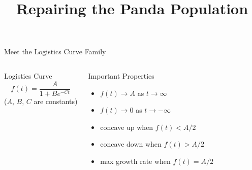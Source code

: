 \documentclass[10pt,aspectratio=1610,xcolor={dvipsnames}]{beamer}
\title{Repairing the Panda Population}
\begin{document}
  \begin{frame}
    \titlepage
  \end{frame}

  \begin{frame}{Meet the Logistics Curve Family}

    \begin{figure}
      \scalebox{0.75}{}
    \end{figure}

    \begin{columns}

      \begin{block}{Logistics Curve}
        \[
          f(t) = \frac{A}{1 + Be^{-Ct}}
        \]
        ($A$, $B$, $C$ are constants)
      \end{block}

      \begin{block}{Important Properties}
        \begin{itemize}
          \item{$f(t) \to A$ as $t \to \infty$}
          \item{$f(t) \to 0$ as $t \to -\infty$}
          \item{concave up when $f(t) < A / 2$}
          \item{concave down when $f(t) > A / 2$}
          \item{max growth rate when $f(t) = A / 2$}
        \end{itemize}
      \end{block}

    \end{columns}

  \end{frame}
\end{document}

